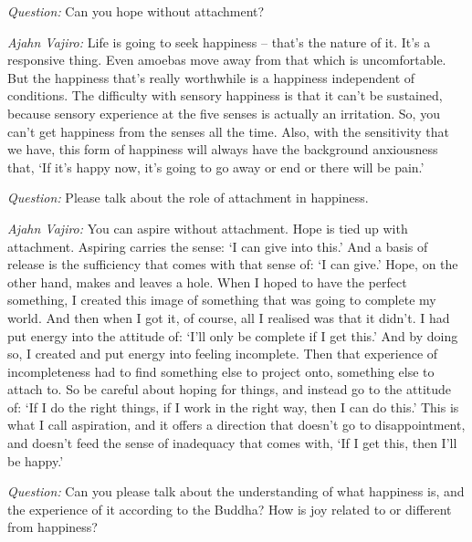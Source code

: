 \enlargethispage{\baselineskip}

\bigskip

\emph{Question:} Can you hope without attachment?

\emph{Ajahn Vajiro:} Life is going to seek happiness -- that's the nature of it. It's a
responsive thing. Even amoebas move away from that which is uncomfortable. But
the happiness that's really worthwhile is a happiness independent of conditions.
The difficulty with sensory happiness is that it can't be sustained, because
sensory experience at the five senses is actually an irritation. So, you can't get happiness from
the senses all the time. Also, with the sensitivity that we have, this form of
happiness will always have the background anxiousness that, `If it's happy now, it's
going to go away or end or there will be pain.'

\bigskip

\emph{Question:} Please talk about the role of attachment in happiness.

\emph{Ajahn Vajiro:} You can aspire without attachment. Hope is tied up with
attachment. Aspiring carries the sense: `I can give into this.' And a basis of
release is the sufficiency that comes with that sense of: `I can give.' Hope, on
the other hand, makes and leaves a hole. When I hoped to have the perfect
something, I created this image of something that was going to complete my
world. And then when I got it, of course, all I realised was that it didn't. I
had put energy into the attitude of: `I'll only be complete if I get this.' And
by doing so, I created and put energy into feeling incomplete. Then that
experience of incompleteness had to find something else to project onto,
something else to attach to. So be careful about hoping for things, and instead
go to the attitude of: `If I do the right things, if I work in the right way,
then I can do this.' This is what I call aspiration, and it offers a direction
that doesn't go to disappointment, and doesn't feed the sense of inadequacy that
comes with, `If I get this, then I'll be happy.'

\bigskip

\emph{Question:} Can you please talk about the understanding of what happiness is, and
the experience of it according to the Buddha? How is joy related to or different
from happiness?

